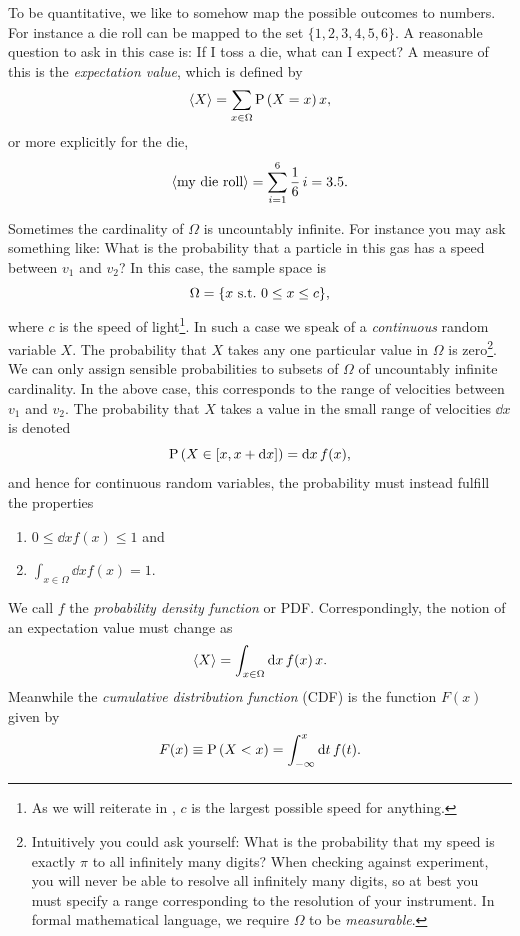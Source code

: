 To be quantitative, we like to somehow map the possible outcomes to numbers. For
instance a die roll can be mapped to the set $\{1,2,3,4,5,6\}$. A reasonable
question to ask in this case is: If I toss a die, what can I expect? A measure
of this is the {\it expectation value}, which is
defined by
\begin{equation}
\ev{X}=\sum_{x\in\Omega}\pr{X=x}x,
\end{equation}
or more explicitly for the die,
\begin{equation}
\ev{\text{my die roll}}=\sum_{i=1}^6\frac{1}{6}\,i=3.5.
\end{equation}

Sometimes the cardinality of $\Omega$ is uncountably infinite. For instance you
may ask something like: What is the probability that a particle in this gas has
a speed between $v_1$ and $v_2$? In this case, the sample space is
\begin{equation}
  \Omega=\{x~\text{s.t.}~0\leq x\leq c\},
\end{equation}
where $c$ is the speed of light\footnote{As we will reiterate in
, $c$ is the largest possible speed for anything.}.
In such a case we speak of a {\it continuous} random variable $X$.
The probability that $X$ takes any one particular value in $\Omega$ is
zero\footnote{Intuitively you could ask yourself: What is the probability that
my speed is exactly $\pi$ to all infinitely many digits? When checking against
experiment, you will never be able to resolve all infinitely many digits, so at
best you must specify a range corresponding to the resolution of your
instrument. In formal mathematical language, we require $\Omega$ to be
{\it measurable}.}. 
We can only assign
sensible probabilities to subsets of $\Omega$ of uncountably infinite
cardinality. In the above
case, this corresponds to the range of velocities between $v_1$ and $v_2$.
The probability that $X$ takes a value in the small range of velocities $\dd x$
is denoted
\begin{equation}
   \operatorname{P}\left(X\in[x,x+\dd x]\right)=\dd{x}f(x),
\end{equation}
and hence for continuous random variables, the probability must instead
fulfill the properties
\begin{enumerate}
  \item  $0\leq\dd{x}f(x)\leq 1$ and
  \item $\int_{x\in\Omega}\dd{x}f(x)=1$.
\end{enumerate}
We call $f$ the {\it probability density function} or PDF.
Correspondingly, the notion of an expectation value
must change as
\begin{equation}
\ev{X}=\int_{x\in\Omega}\dd{x}f(x)\,x.
\end{equation}
Meanwhile the {\it cumulative distribution function} (CDF) is the function
$F(x)$ given by
\begin{equation}
  F(x)\equiv \operatorname{P}\left(X<x\right)=\int_{-\infty}^x\dd{t}f(t).
\end{equation} 



